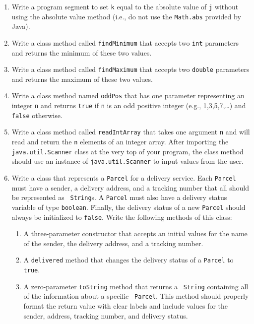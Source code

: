 \documentclass[12pt]{article}
\begin{document}
\begin{enumerate}

\item Write a program segment to set {\tt k} equal to the absolute
  value of {\tt j} without using the absolute value method (i.e., do
  not use the {\tt Math.abs} provided by Java).

\item Write a class method called {\tt findMinimum} that accepts two
  {\tt int} parameters and returns the minimum of these two values.

\item Write a class method called {\tt findMaximum} that accepts two
  {\tt double} parameters and returns the maximum of these two values.

\item Write a class method named {\tt oddPos} that has one parameter
  representing an integer {\tt n} and returns {\tt true} if
  {\tt n} is an odd positive integer (e.g., 1,3,5,7,\ldots) and {\tt
    false} otherwise.

\item Write a class method called {\tt readIntArray} that takes one
  argument {\tt n} and will read and return the {\tt n} elements of an
  integer array.  After importing the {\tt java.util.Scanner} class at
  the very top of your program, the class method should use an
  instance of {\tt java.util.Scanner} to input values from the user.

\item Write a class that represents a {\tt Parcel} for a delivery
  service.  Each {\tt Parcel} must have a sender, a delivery address,
  and a tracking number that all should be represented as {\tt
    String}s.  A {\tt Parcel} must also have a delivery status
  variable of type {\tt boolean}.  Finally, the delivery status of a
  new {\tt Parcel} should always be initialized to {\tt false}.  Write
  the following methods of this class:

  \begin{enumerate}
    \item A three-parameter constructor that accepts an initial values
      for the name of the sender, the delivery address, and a tracking
      number.

    \item A {\tt delivered} method that changes the delivery status of
      a {\tt Parcel} to {\tt true}.

    \item A zero-parameter {\tt toString} method that returns a {\tt
      String} containing all of the information about a specific {\tt
      Parcel}.  This method should properly format the return value
      with clear labels and include values for the sender, address,
      tracking number, and delivery status.


\end{enumerate}
\end{enumerate}
\end{document}
